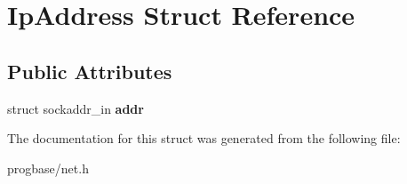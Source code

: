 \hypertarget{struct_ip_address}{}\section{Ip\+Address Struct Reference}
\label{struct_ip_address}
\subsection*{Public Attributes}
\begin{DoxyCompactItemize}
\item 
\mbox{\label{struct_ip_address_ace9bed8e9bae1ae849daa6ad66504458}} 
struct sockaddr\+\_\+in {\bfseries addr}
\end{DoxyCompactItemize}


The documentation for this struct was generated from the following file\+:\begin{DoxyCompactItemize}
\item 
progbase/net.\+h\end{DoxyCompactItemize}
